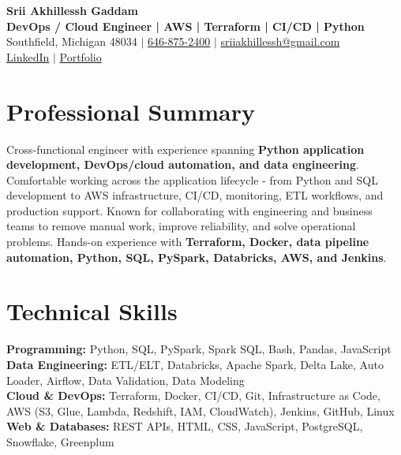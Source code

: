 \documentclass[letterpaper,10pt]{article}
\begin{document}
\fontsize{9.35pt}{10.45pt}\selectfont

\begin{center}
    {\LARGE \textbf{Srii Akhillessh Gaddam}} \\[-1pt]
    \textbf{DevOps / Cloud Engineer | AWS | Terraform | CI/CD | Python} \\[2pt]
    Southfield, Michigan 48034 $|$
    \href{tel:6468752400}{646-875-2400} $|$
    \href{mailto:sriiakhillessh@gmail.com}{sriiakhillessh@gmail.com} \\[1pt]
    \href{https://www.linkedin.com/in/srii-akhiilessh-gaddam-b48668191/}{LinkedIn} $|$
    \href{https://sriiakhillesshg.github.io/portfolio/}{Portfolio}
\end{center}
\vspace{-8pt}

\section{Professional Summary}
\small{Cross-functional engineer with experience spanning \textbf{Python application development, DevOps/cloud automation, and data engineering}. Comfortable working across the application lifecycle - from Python and SQL development to AWS infrastructure, CI/CD, monitoring, ETL workflows, and production support. Known for collaborating with engineering and business teams to remove manual work, improve reliability, and solve operational problems. Hands-on experience with \textbf{Terraform, Docker, data pipeline automation, Python, SQL, PySpark, Databricks, AWS, and Jenkins}.}

\section{Technical Skills}
\small{
\textbf{Programming:} Python, SQL, PySpark, Spark SQL, Bash, Pandas, JavaScript \\
\textbf{Data Engineering:} ETL/ELT, Databricks, Apache Spark, Delta Lake, Auto Loader, Airflow, Data Validation, Data Modeling \\
\textbf{Cloud \& DevOps:} Terraform, Docker, CI/CD, Git, Infrastructure as Code, AWS (S3, Glue, Lambda, Redshift, IAM, CloudWatch), Jenkins, GitHub, Linux \\
\textbf{Web \& Databases:} REST APIs, HTML, CSS, JavaScript, PostgreSQL, Snowflake, Greenplum
}
\end{document}
